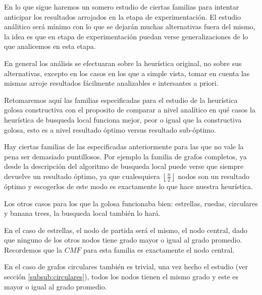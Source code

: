 En lo que sigue haremos un somero estudio de ciertas familias
para intentar anticipar los resultados arrojados en la etapa
de experimentaci\'on. El estudio an\'alitico ser\'a m\'inimo
con lo que se dejar\'an muchas alternativas fuera del mismo,
la idea es que en etapa de experimentaci\'on puedan verse
generalizaciones de lo que analicemos en esta etapa.

En general los an\'alisis se efectuaran sobre la heur\'istica
original, no sobre sus alternativas, excepto en los casos en 
los que a simple vista, tomar en cuenta las mismas arroje
resultados f\'acilmente analizables e intersantes a priori.

Retomaremos aqu\'i las familias especificadas para el estudio
de la heur\'istica golosa constructiva con el proposito de 
comparar a nivel anal\'itico en qu\'e casos la heur\'istica
de busqueda local funciona mejor, peor o igual que la constructiva
golosa, esto es a nivel resultado \'optimo versus resultado
sub-\'optimo.

Hay ciertas familias de las especificadas anteriormente para
las que no vale la pena ser demasiado puntillosos. 
Por ejemplo la familia de grafos completos, ya desde la 
descripci\'on del algoritmo de busqueda local puede verse que 
siempre devuelve un resultado \'optimo, ya que cualesquiera
$\left\lfloor \frac{n}{2} \right\rfloor$ nodos son un 
resultado \'optimo y escogerlos de este modo es exactamente 
lo que hace nuestra heur\'istica.

Los otros casos para los que la golosa funcionaba bien: estrellas,
ruedas, circulares y banana trees, la busqueda local tambi\'en 
lo har\'a. 

En el caso de estrellas, el nodo de partida ser\'a el mismo, el 
nodo central, dado que ninguno de los otros nodos tiene grado 
mayor o igual al grado promedio. Recordemos que la $CMF$ para
esta familia es exactamente el nodo central.

En el caso de grafos circulares tambi\'en es trivial, una vez 
hecho el estudio (ver secci\'on \ref{subsub:circulares}), todos los nodos
tienen el mismo grado y este es mayor o igual al grado promedio.


